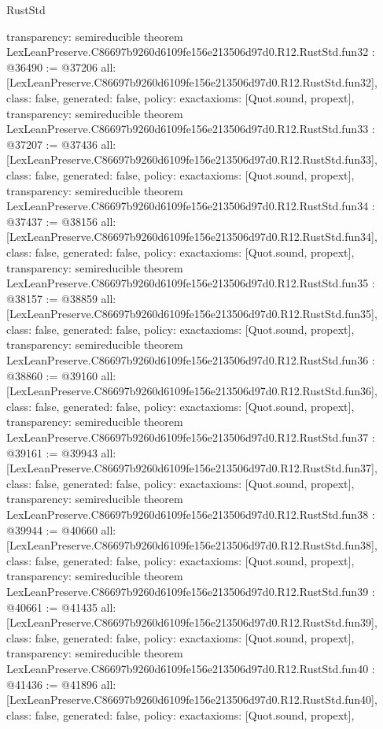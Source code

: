 \begin{lexlean}{RustStd}
\begin{coremodule}
{  transparency: semireducible
}
theorem LexLeanPreserve.C86697b9260d6109fe156e213506d97d0.R12.RustStd.fun32 : @36490 := @37206 {
  all: [LexLeanPreserve.C86697b9260d6109fe156e213506d97d0.R12.RustStd.fun32],
  class: false,
  generated: false,
  policy: exact{axioms: [Quot.sound, propext]},
  transparency: semireducible
}
theorem LexLeanPreserve.C86697b9260d6109fe156e213506d97d0.R12.RustStd.fun33 : @37207 := @37436 {
  all: [LexLeanPreserve.C86697b9260d6109fe156e213506d97d0.R12.RustStd.fun33],
  class: false,
  generated: false,
  policy: exact{axioms: [Quot.sound, propext]},
  transparency: semireducible
}
theorem LexLeanPreserve.C86697b9260d6109fe156e213506d97d0.R12.RustStd.fun34 : @37437 := @38156 {
  all: [LexLeanPreserve.C86697b9260d6109fe156e213506d97d0.R12.RustStd.fun34],
  class: false,
  generated: false,
  policy: exact{axioms: [Quot.sound, propext]},
  transparency: semireducible
}
theorem LexLeanPreserve.C86697b9260d6109fe156e213506d97d0.R12.RustStd.fun35 : @38157 := @38859 {
  all: [LexLeanPreserve.C86697b9260d6109fe156e213506d97d0.R12.RustStd.fun35],
  class: false,
  generated: false,
  policy: exact{axioms: [Quot.sound, propext]},
  transparency: semireducible
}
theorem LexLeanPreserve.C86697b9260d6109fe156e213506d97d0.R12.RustStd.fun36 : @38860 := @39160 {
  all: [LexLeanPreserve.C86697b9260d6109fe156e213506d97d0.R12.RustStd.fun36],
  class: false,
  generated: false,
  policy: exact{axioms: [Quot.sound, propext]},
  transparency: semireducible
}
theorem LexLeanPreserve.C86697b9260d6109fe156e213506d97d0.R12.RustStd.fun37 : @39161 := @39943 {
  all: [LexLeanPreserve.C86697b9260d6109fe156e213506d97d0.R12.RustStd.fun37],
  class: false,
  generated: false,
  policy: exact{axioms: [Quot.sound, propext]},
  transparency: semireducible
}
theorem LexLeanPreserve.C86697b9260d6109fe156e213506d97d0.R12.RustStd.fun38 : @39944 := @40660 {
  all: [LexLeanPreserve.C86697b9260d6109fe156e213506d97d0.R12.RustStd.fun38],
  class: false,
  generated: false,
  policy: exact{axioms: [Quot.sound, propext]},
  transparency: semireducible
}
theorem LexLeanPreserve.C86697b9260d6109fe156e213506d97d0.R12.RustStd.fun39 : @40661 := @41435 {
  all: [LexLeanPreserve.C86697b9260d6109fe156e213506d97d0.R12.RustStd.fun39],
  class: false,
  generated: false,
  policy: exact{axioms: [Quot.sound, propext]},
  transparency: semireducible
}
theorem LexLeanPreserve.C86697b9260d6109fe156e213506d97d0.R12.RustStd.fun40 : @41436 := @41896 {
  all: [LexLeanPreserve.C86697b9260d6109fe156e213506d97d0.R12.RustStd.fun40],
  class: false,
  generated: false,
  policy: exact{axioms: [Quot.sound, propext]},
}
\end{coremodule}
\end{lexlean}
